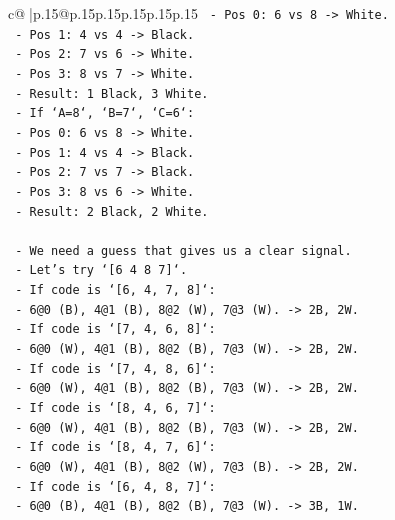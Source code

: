 \documentclass{article}
\begin{document}
{\begin{supertabular}{c@{$\;$}|p{.15\linewidth}@{}p{.15\linewidth}p{.15\linewidth}p{.15\linewidth}p{.15\linewidth}p{.15\linewidth}}
{{{\texttt{                        {-} Pos 0: 6 vs 8 {-}> White.} \\
\texttt{                        {-} Pos 1: 4 vs 4 {-}> Black.} \\
\texttt{                        {-} Pos 2: 7 vs 6 {-}> White.} \\
\texttt{                        {-} Pos 3: 8 vs 7 {-}> White.} \\
\texttt{                        {-} Result: 1 Black, 3 White.} \\
\texttt{                    {-} If `A=8`, `B=7`, `C=6`:} \\
\texttt{                        {-} Pos 0: 6 vs 8 {-}> White.} \\
\texttt{                        {-} Pos 1: 4 vs 4 {-}> Black.} \\
\texttt{                        {-} Pos 2: 7 vs 7 {-}> Black.} \\
\texttt{                        {-} Pos 3: 8 vs 6 {-}> White.} \\
\texttt{                        {-} Result: 2 Black, 2 White.} \\
\\ 
\texttt{    {-} We need a guess that gives us a clear signal.} \\
\texttt{    {-} Let's try `{[}6 4 8 7{]}`.} \\
\texttt{        {-} If code is `{[}6, 4, 7, 8{]}`:} \\
\texttt{            {-} 6@0 (B), 4@1 (B), 8@2 (W), 7@3 (W). {-}> 2B, 2W.} \\
\texttt{        {-} If code is `{[}7, 4, 6, 8{]}`:} \\
\texttt{            {-} 6@0 (W), 4@1 (B), 8@2 (B), 7@3 (W). {-}> 2B, 2W.} \\
\texttt{        {-} If code is `{[}7, 4, 8, 6{]}`:} \\
\texttt{            {-} 6@0 (W), 4@1 (B), 8@2 (B), 7@3 (W). {-}> 2B, 2W.} \\
\texttt{        {-} If code is `{[}8, 4, 6, 7{]}`:} \\
\texttt{            {-} 6@0 (W), 4@1 (B), 8@2 (B), 7@3 (W). {-}> 2B, 2W.} \\
\texttt{        {-} If code is `{[}8, 4, 7, 6{]}`:} \\
\texttt{            {-} 6@0 (W), 4@1 (B), 8@2 (W), 7@3 (B). {-}> 2B, 2W.} \\
\texttt{        {-} If code is `{[}6, 4, 8, 7{]}`:} \\
\texttt{            {-} 6@0 (B), 4@1 (B), 8@2 (B), 7@3 (W). {-}> 3B, 1W.} \\
}}}
\end{supertabular}}
\end{document}
